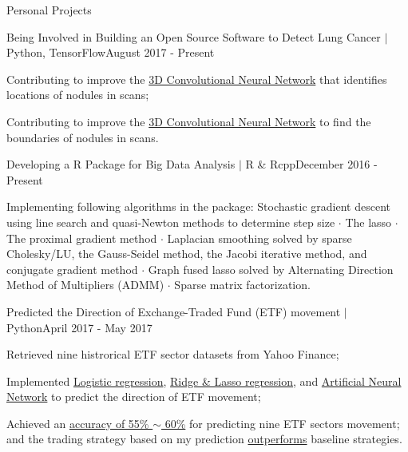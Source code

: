 \documentclass{my_resume} %
\begin{document}
\begin{rSection}{Personal Projects}
  \begin{rSubsection}{Being Involved in Building an Open Source Software to
      Detect Lung Cancer $|$ Python, TensorFlow}{}{August 2017 - Present}
    \item Contributing to improve the \underline{3D Convolutional Neural Network} that identifies
    locations of nodules in scans;
  \item Contributing to improve the \underline{3D Convolutional Neural Network} to find the
    boundaries of nodules in scans.
  \end{rSubsection}

  \begin{rSubsection}{Developing a R Package for Big Data Analysis $|$ R \&
    Rcpp}{}{December 2016 - Present}
  \item Implementing following algorithms in the package: Stochastic gradient
    descent using line search and quasi-Newton methods to determine step size
    {$\cdot$} The lasso {$\cdot$} The proximal gradient method {$\cdot$}
    Laplacian smoothing solved by sparse Cholesky/LU, the Gauss-Seidel method,
    the Jacobi iterative method, and conjugate gradient method {$\cdot$} Graph
    fused lasso solved by Alternating Direction Method of Multipliers (ADMM)
    {$\cdot$} Sparse matrix factorization.
  \end{rSubsection}

  \begin{rSubsection}{Predicted the Direction of Exchange-Traded Fund
    (ETF) movement $|$ Python}{}{April 2017 - May 2017}
  \item Retrieved nine histrorical ETF sector datasets from Yahoo Finance;
  \item Implemented \underline{Logistic regression}, \underline{Ridge \& Lasso
    regression}, and \underline{Artificial Neural Network} to predict the
    direction of ETF movement;
  \item Achieved an \underline{accuracy of 55\% $\sim$ 60\%} for predicting
    nine ETF sectors movement; and the trading strategy based on my prediction
    \underline{outperforms} baseline strategies.
  \end{rSubsection}



\end{rSection}
\end{document}
